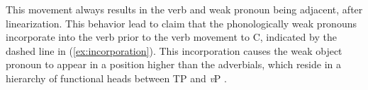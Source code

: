 \documentclass[12pt, letterpaper]{article}
\begin{document}
This movement always results in the verb and weak pronoun being adjacent, after linearization. This behavior lead \citet{erteschik-shirSoundPatternsSyntax2005} to claim that the phonologically weak pronouns incorporate into the verb prior to the verb movement to C, indicated by the dashed line in (\ref{ex:incorporation}). This incorporation causes the weak object pronoun to appear in a position higher than the adverbials, which reside in a hierarchy of functional heads between TP and \emph{v}P \citep{cinqueAdverbsFunctionalHeads1999}. 
\ea \label{ex:incorporation}
\z 
\end{document}

